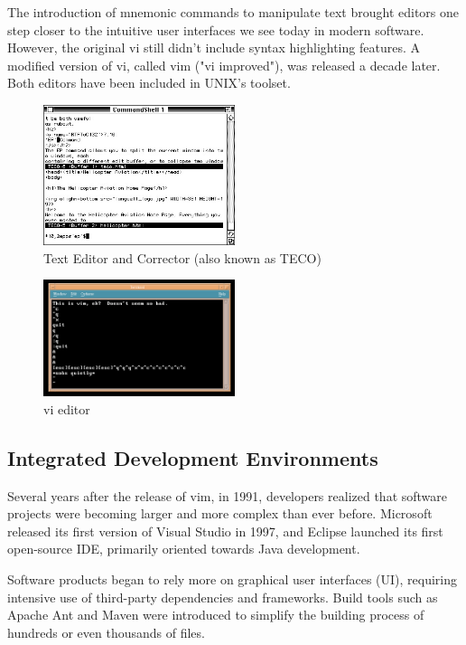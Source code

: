 The introduction of mnemonic commands to manipulate text brought editors one step closer to the intuitive user interfaces we see today in modern software. However, the original vi still didn't include syntax highlighting features. A modified version of vi, called vim ("vi improved"), was released a decade later. Both editors have been included in UNIX's toolset.

\begin{figure}[h]
\centering
\includegraphics[width=0.5\textwidth]{images/teco.jpg}
\caption{Text Editor and Corrector (also known as TECO)}
\label{fig:fig2,1.}
\end{figure}

\begin{figure}[h]
\centering
\includegraphics[width=0.5\textwidth]{images/vi.png}
\caption{vi editor}
\label{fig:fig2,1.}
\end{figure}

\subsection{Integrated Development Environments}

Several years after the release of vim, in 1991, developers realized that software projects were becoming larger and more complex than ever before. Microsoft released its first version of Visual Studio in 1997, and Eclipse launched its first open-source IDE, primarily oriented towards Java development.

Software products began to rely more on graphical user interfaces (UI), requiring intensive use of third-party dependencies and frameworks. Build tools such as Apache Ant and Maven were introduced to simplify the building process of hundreds or even thousands of files.

